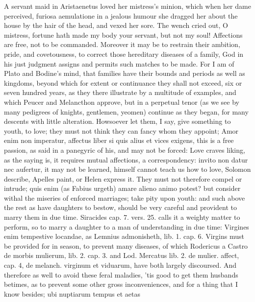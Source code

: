 %
A servant maid in Aristaenetus loved her mistress's minion, which
when her dame perceived, furiosa aemulatione in a jealous humour she
dragged her about the house by the hair of the head, and vexed her
sore. The wench cried out, O mistress, fortune hath made my body
your servant, but not my soul! Affections are free, not to be
commanded. Moreover it may be to restrain their ambition, pride, and
covetousness, to correct those hereditary diseases of a family, God in
his just judgment assigns and permits such matches to be made. For I am
of Plato and  Bodine's mind, that families have their bounds and
periods as well as kingdoms, beyond which for extent or continuance
they shall not exceed, six or seven hundred years, as they there
illustrate by a multitude of examples, and which Peucer and
Melancthon approve, but in a perpetual tenor (as we see by many
pedigrees of knights, gentlemen, yeomen) continue as they began, for
many descents with little alteration. Howsoever let them, I say, give
something to youth, to love; they must not think they can fancy whom
they appoint; Amor enim non imperatur, affectus liber si quis
alius et vices exigens, this is a free passion, as \Pliny{} said in a
panegyric of his, and may not be forced: Love craves liking, as the
saying is, it requires mutual affections, a correspondency: invito non
datur nec aufertur, it may not be learned, \Ovid himself cannot teach us
how to love, Solomon describe, Apelles paint, or Helen express it. They
must not therefore compel or intrude; quis enim (as Fabius
urgeth) amare alieno animo potest? but consider withal the miseries of
enforced marriages; take pity upon youth: and such above the rest as
have daughters to bestow, should be very careful and provident to marry
them in due time. Siracides cap. 7. vers. 25. calls it a weighty matter
to perform, so to marry a daughter to a man of understanding in due
time: Virgines enim tempestive locandae, as Lemnius admonisheth,
lib. 1. cap. 6. Virgins must be provided for in season, to prevent many
diseases, of which Rodericus a Castro de morbis mulierum, lib. 2.
cap. 3. and Lod. Mercatus lib. 2. de mulier. affect, cap. 4, de
melanch. virginum et viduarum, have both largely discoursed. And
therefore as well to avoid these feral maladies, 'tis good to get them
husbands betimes, as to prevent some other gross inconveniences, and
for a thing that I know besides; ubi nuptiarum tempus et aetas
